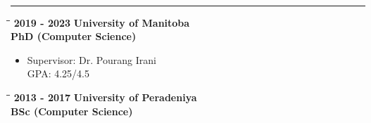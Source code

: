 \documentclass[a4paper,11pt]{article}
\begin{document}
\vspace{15pt}
\noindent\textbf{\large{}}
\vspace{-8pt}\noindent\\\rule{0.75\textwidth}{0.4pt}
\vspace{-8pt}
\begin{tabbing}
  \=\hspace*{3cm}\=\hspace*{3cm}\= \kill
  \>\textbf{\large \textbar{}}\textbf{ 2019 - 2023} \> \textbf{University of Manitoba} \\ \> \> \textbf{PhD (Computer Science)}
\end{tabbing}
\begin{itemize}
\item[] Supervisor: Dr. Pourang Irani\\
  GPA: 4.25/4.5
\end{itemize}
\begin{tabbing}
  \=\hspace*{3cm}\=\hspace*{3cm}\= \kill
  \>\textbf{\large \textbar{}}\textbf{ 2013 - 2017} \> \textbf{University of Peradeniya} \\ \> \> \textbf{BSc (Computer Science)}
\end{tabbing}
\end{document}
